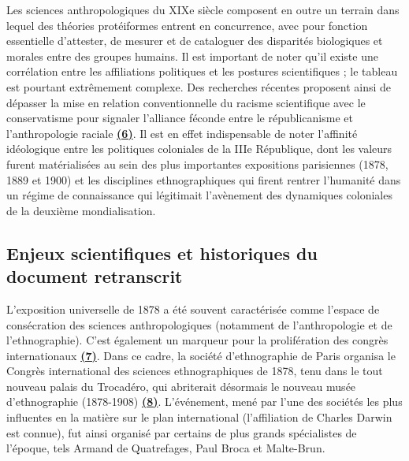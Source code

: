 \documentclass{article}
\begin{document}
	Les sciences anthropologiques du XIXe siècle composent en outre un terrain dans lequel des théories protéiformes entrent en concurrence, avec pour fonction essentielle d’attester, de mesurer et de cataloguer des disparités biologiques et morales entre des groupes humains. Il est important de noter qu’il existe une corrélation entre les affiliations politiques et les postures scientifiques ; le tableau est pourtant extrêmement complexe. Des recherches récentes proposent ainsi de dépasser la mise en relation conventionnelle du racisme scientifique avec le conservatisme pour signaler l’alliance féconde entre le républicanisme et l’anthropologie raciale \underline{\textbf{(6)}}. Il est en effet indispensable de noter l’affinité idéologique entre les politiques coloniales de la IIIe République, dont les valeurs furent matérialisées au sein des plus importantes expositions parisiennes (1878, 1889 et 1900) et les disciplines ethnographiques qui firent rentrer l’humanité dans un régime de connaissance qui légitimait l’avènement des dynamiques coloniales de la deuxième mondialisation.
	
	
	\subsection{Enjeux scientifiques et historiques du document retranscrit}
	
	L’exposition universelle de 1878 a été souvent caractérisée comme l’espace de consécration des sciences anthropologiques (notamment de l’anthropologie et de l’ethnographie). C’est également un marqueur pour la prolifération des congrès internationaux \underline{\textbf{(7)}}. Dans ce cadre, la société d’ethnographie de Paris organisa le Congrès international des sciences ethnographiques de 1878, tenu dans le tout nouveau palais du Trocadéro, qui abriterait désormais le nouveau musée d’ethnographie (1878-1908) \underline{\textbf{(8)}}. L’événement, mené par l’une des sociétés les plus influentes en la matière sur le plan international (l’affiliation de Charles Darwin est connue), fut ainsi organisé par certains de plus grands spécialistes de l’époque, tels Armand de Quatrefages, Paul Broca et Malte-Brun. 
	
\end{document}
